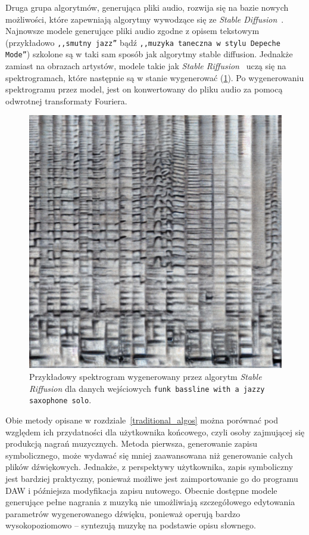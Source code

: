 Druga grupa algorytmów, generująca pliki audio, rozwija się na bazie nowych możliwości,
które zapewniają algorytmy wywodzące się ze \textit{Stable Diffusion}~\cite{stablediffusion}.
Najnowsze modele generujące pliki audio zgodne z opisem tekstowym 
(przykładowo \texttt{,,smutny jazz''} bądź \texttt{,,muzyka taneczna w stylu Depeche Mode''})
szkolone są w taki sam sposób jak algorytmy stable diffusion. 
Jednakże zamiast na obrazach artystów, modele takie jak \textit{Stable Riffusion}~\cite{riffusion} 
uczą się na spektrogramach, które następnie są w stanie wygenerować (\ref{fig:riffusion_spectro}).
Po wygenerowaniu spektrogramu przez model,
jest on konwertowany do pliku audio za pomocą odwrotnej transformaty Fouriera.

\begin{figure}[H]
    \centering
    \includegraphics[width=0.4\linewidth]{rys01/riffusion_spectro.jpg}
    \caption{
      Przykładowy spektrogram wygenerowany przez algorytm \textit{Stable Riffusion}
      dla danych wejściowych \texttt{funk bassline with a jazzy saxophone solo}.
    }\label{fig:riffusion_spectro}
\end{figure}


Obie metody opisane w rozdziale~\ref{traditional_algos} można porównać pod względem ich przydatności
dla użytkownika końcowego, czyli osoby zajmującej się produkcją nagrań muzycznych. Metoda pierwsza, 
generowanie zapisu symbolicznego, może wydawać się mniej zaawansowana niż generowanie całych plików dźwiękowych.
Jednakże, z perspektywy użytkownika, zapis symboliczny jest bardziej praktyczny,
ponieważ możliwe jest zaimportowanie go do programu DAW i późniejsza modyfikacja zapisu nutowego.
Obecnie dostępne modele generujące pełne nagrania z muzyką nie umożliwiają
szczegółowego edytowania parametrów wygenerowanego dźwięku, ponieważ operują bardzo wysokopoziomowo 
-- syntezują muzykę na podstawie opisu słownego.

